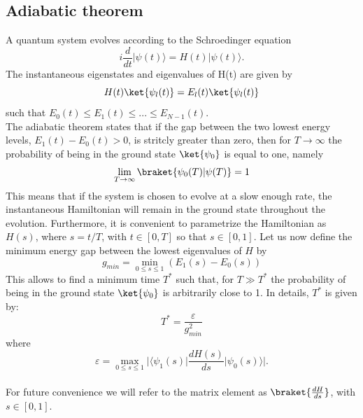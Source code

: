     \subsection{Adiabatic theorem}\label{subsec:adiabatic theorem}
    A quantum system evolves according to the Schroedinger equation
    \begin{equation}
        i\frac{d}{dt}|\psi(t)\rangle = H(t)|\psi(t)\rangle.
    \end{equation}
    The instantaneous eigenstates and eigenvalues of H(t) are given by
    \begin{equation}
        H(t)\ket{\psi_l(t)} = E_l(t)\ket{\psi_l(t)}
    \end{equation}
    such that $E_0(t) \leq E_1(t) \leq ... \leq E_{N-1}(t)$. \\
    The adiabatic theorem states that if the gap between the two lowest energy levels, $E_{1}(t) - E_{0}(t) > 0$, is stritcly greater than zero, then for $T\rightarrow \infty$ the probability of being in the ground state $\ket{\psi_0}$ is equal to one, namely
    \begin{equation}
        \lim_{T \to \infty} \braket{\psi_0(T)|\psi(T)}= 1
    \end{equation}
    This means that if the system is chosen to evolve at a slow enough rate, the instantaneous Hamiltonian will remain in the ground state throughout the evolution. Furthermore, it is convenient to parametrize the Hamiltonian as $H(s)$, where $s=t/T$, with $t \in [0,T]$ so that $s \in [0,1]$.
    Let us now define the minimum energy gap between the lowest eigenvalues of $H$ by
    \begin{equation}
        g_{min} = \min_{0 \leq s \leq 1} (E_1(s)-E_0(s))
    \end{equation}
    This allows to find a minimum time $T^*$ such that, for $T\gg T^*$ the probability of being in the ground state $\ket{\psi_0}$ is arbitrarily close to 1. In details, $T^*$ is given by:
    \begin{equation}
        T^* = \frac{\varepsilon}{g^{2}_{min}}
        \label{eq:adiabatic_time}
    \end{equation}
    where
    \begin{equation}
        \varepsilon = \max_{0 \leq s \leq 1} \Big| \Big\langle \psi_1(s)\Big| \frac{dH(s)}{ds} \Big| \psi_0(s)\Big\rangle\Big|.
    \end{equation}\\
For future convenience we will refer to the matrix element as $\braket{\frac{dH}{ds}}$, with $s\in[0,1]$. \\ \\

